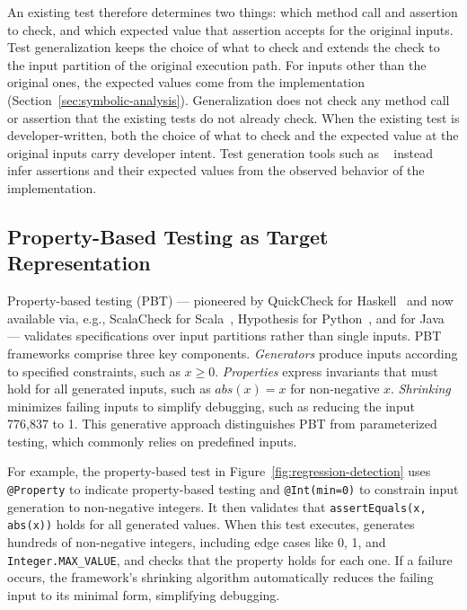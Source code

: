 An existing test therefore determines two things:
which method call and assertion to check,
and which expected value that assertion accepts for the original inputs.
Test generalization keeps the choice of what to check
and extends the check to the input partition of the original execution path.
For inputs other than the original ones,
the expected values come from the implementation (Section~\ref{sec:symbolic-analysis}).
Generalization does not check any method call or assertion
that the existing tests do not already check.
When the existing test is developer-written,
both the choice of what to check and the expected value at the original inputs carry developer intent.
Test generation tools such as \ToolEvoSuite{}~\cite{fraser_2011_evosuite}
instead infer assertions and their expected values from the observed behavior of the implementation.

\subsection{Property-Based Testing as Target Representation}
\label{sec:property-based-testing}

Property-based testing (PBT) --- pioneered by QuickCheck for Haskell~\cite{claessen_2000_quickcheck}
and now available via, e.g., ScalaCheck for Scala~\cite{nilsson_2014_scalacheck},
Hypothesis for Python~\cite{maciver_2019_hypothesis}, and \ToolJqwik{} for Java~\cite{link_2022_jqwik} ---
validates specifications over input partitions rather than single inputs.
%
PBT frameworks comprise three key components.
\emph{Generators} produce inputs according to specified constraints, such as $x \geq 0$.
\emph{Properties} express invariants that must hold for all generated inputs,
such as $abs(x) = x$ for non-negative $x$.
\emph{Shrinking} minimizes failing inputs to simplify debugging,
such as reducing the input 776,837 to 1.
This generative approach distinguishes PBT from parameterized testing,
which commonly relies on predefined inputs.

For example, the property-based test in Figure~\ref{fig:regression-detection}
uses \texttt{@Property} to indicate property-based testing
and \texttt{@Int(min=0)} to constrain input generation to non-negative integers.
It then validates that \texttt{assertEquals(x, abs(x))} holds for all generated values.
When this test executes, \ToolJqwik{} generates hundreds of non-negative integers,
including edge cases like 0, 1, and \texttt{Integer.MAX\_VALUE},
and checks that the property holds for each one.
If a failure occurs, the framework's shrinking algorithm automatically reduces
the failing input to its minimal form, simplifying debugging.

